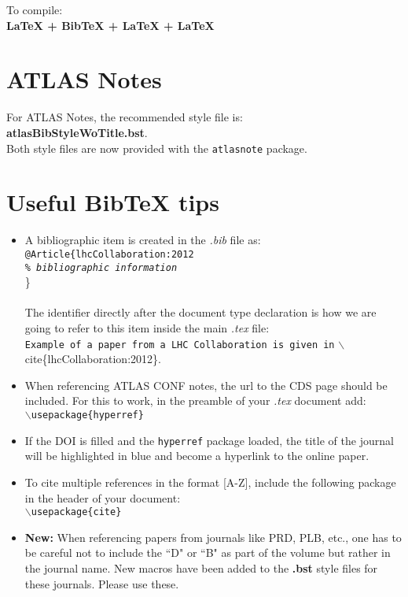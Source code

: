 \documentclass{../atlasnote}
\begin{document}
\bigskip
\noindent To compile: \\
\indent \textbf{LaTeX + BibTeX + LaTeX + LaTeX} 


\section{ATLAS Notes}

For ATLAS Notes, the recommended style file is: \\
\indent \textbf{atlasBibStyleWoTitle.bst}.\\

\noindent Both style files are now provided with the \texttt{atlasnote} package.


\section{Useful BibTeX tips}

\begin{itemize}
	\item A bibliographic item is created in the \emph{.bib} file as: \\
		\texttt{@Article\{lhcCollaboration:2012 \\ \emph{\% bibliographic information}} \\ \} \\
		\\
		The identifier directly after the document type declaration is how we are going to refer to this item inside the main \emph{.tex} file: \\
		{\small{\texttt{Example of a paper from a LHC Collaboration is given in} $\backslash$cite\{lhcCollaboration:2012\}.}}
	\item When referencing ATLAS CONF notes, the url to the CDS page should be included. For this to work, in the preamble of your \emph{.tex} document add: \\
		\texttt{$\backslash$usepackage\{hyperref\}}
	\item If the DOI is filled and the \texttt{hyperref} package loaded, the title of the journal will be highlighted in blue and become a hyperlink to the online paper.
	\item To cite multiple references in the format [A-Z], include the following package in the header of your document: \\
	         \texttt{$\backslash$usepackage\{cite\}}	
	\item \textbf{\color{red} New:} When referencing papers from journals like PRD, PLB, etc., one has to be careful not to include the ``D" or ``B" as part of the volume but rather in the journal name. New macros have been added to the \textbf{.bst} style files for these journals. Please use these.
\end{itemize}
\end{document}
